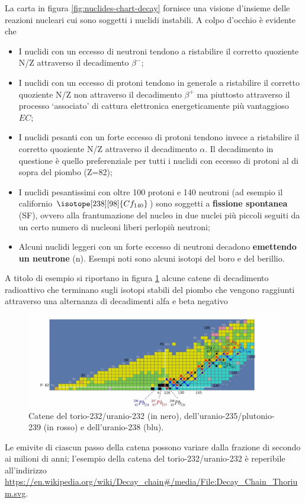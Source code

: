 La carta in figura \ref{fig:nuclides-chart-decay} fornisce una visione d’insieme delle reazioni nucleari cui sono
soggetti i nuclidi instabili.
A colpo d’occhio è evidente che
\begin{itemize}
    \item I nuclidi con un eccesso di neutroni tendono a ristabilire il corretto quoziente N/Z
    attraverso il decadimento $ \beta^-$;
    \item I nuclidi con un eccesso di protoni tendono in generale a ristabilire il corretto quoziente N/Z non attraverso
    il decadimento $ \beta^+$ ma piuttosto attraverso il processo ‘associato’ di cattura elettronica energeticamente più
    vantaggioso $EC$;
    \item I nuclidi pesanti con un forte eccesso di protoni tendono invece a ristabilire il corretto quoziente N/Z
    attraverso il decadimento $ \alpha$.
    Il decadimento in questione è quello preferenziale per tutti i nuclidi con
    eccesso di protoni al di sopra del piombo (Z=82);
    \item I nuclidi pesantissimi con oltre 100 protoni e 140 neutroni (ad esempio il californio $ \isotope[238][98]{\mathlarger{Cf}_{140}}$)
    sono soggetti a \textbf{fissione spontanea} (SF), ovvero alla frantumazione del nucleo in due nuclei più piccoli seguiti
    da un certo numero di nucleoni liberi perlopiù neutroni;
    \item Alcuni nuclidi leggeri con un forte eccesso di neutroni decadono \textbf{emettendo un neutrone} (n).
    Esempi noti sono alcuni isotopi del boro e del berillio.
\end{itemize}

A titolo di esempio si riportano in figura \ref{fig:decay-chain1} alcune catene di decadimento radioattivo che terminano sugli
isotopi stabili del piombo che vengono raggiunti attraverso una alternanza di decadimenti alfa e beta negativo

\begin{figure}
    \centering
    \includegraphics{../figs/decay-chain1}
    \caption{Catene del torio-232/uranio-232 (in nero), dell’uranio-235/plutonio-239 (in rosso) e dell’uranio-238 (blu).}
    \label{fig:decay-chain1}
\end{figure}

Le emivite di ciascun passo della catena possono variare dalla frazione di secondo ai milioni di anni;
l’esempio della catena del torio-232/uranio-232 è reperibile all'indirizzo
\url{https://en.wikipedia.org/wiki/Decay_chain#/media/File:Decay_Chain_Thorium.svg}.